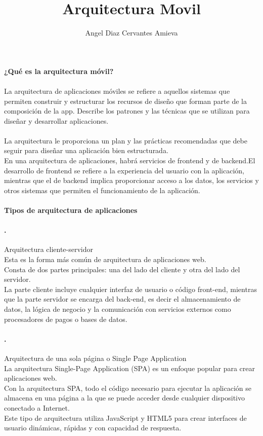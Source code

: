 \documentclass[12pt,a4paper]{article}
\author{Angel Diaz Cervantes Amieva}
\title{Arquitectura Movil}
\begin{document}
\paragraph{¿Qué es la arquitectura móvil?}
\paragraph{}

La arquitectura de aplicaciones móviles se refiere a aquellos sistemas que permiten construir y estructurar los recursos de diseño que forman parte de la composición de la app.
Describe los patrones y las técnicas que se utilizan para diseñar y desarrollar aplicaciones. 
\\
\\La arquitectura le proporciona un plan y las prácticas recomendadas que debe seguir para diseñar una aplicación bien estructurada.
\\
En una arquitectura de aplicaciones, habrá servicios de frontend y de backend.El desarrollo de frontend se refiere a la experiencia del usuario con la aplicación, mientras que el de backend implica proporcionar acceso a los datos, los servicios y otros sistemas que permiten el funcionamiento de la aplicación.
\paragraph{Tipos de arquitectura de aplicaciones}
\paragraph{.}
Arquitectura cliente-servidor
\\
Esta es la forma más común de arquitectura de aplicaciones web.
\\
Consta de dos partes principales: una del lado del cliente y otra del lado del servidor.
\\
La parte cliente incluye cualquier interfaz de usuario o código front-end, mientras que la parte servidor se encarga del back-end, es decir el almacenamiento de datos, la lógica de negocio y la comunicación con servicios externos como procesadores de pagos o bases de datos.
\paragraph{.}
Arquitectura de una sola página o Single Page Application
\\
La arquitectura Single-Page Application (SPA) es un enfoque popular para crear aplicaciones web.
\\
Con la arquitectura SPA, todo el código necesario para ejecutar la aplicación se almacena en una página a la que se puede acceder desde cualquier dispositivo conectado a Internet.
\\
Este tipo de arquitectura utiliza JavaScript y HTML5 para crear interfaces de usuario dinámicas, rápidas y con capacidad de respuesta.
\end{document}
